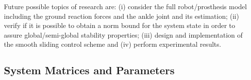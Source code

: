 \documentclass[letterpaper, 10 pt, conference]{ieeeconf}  %
\theoremstyle{plain}
\theoremstyle{definition}
\theoremstyle{remark}
\begin{document}
Future possible topics of research are: (i) consider the full robot/prosthesis model including the ground reaction forces and the ankle joint and its estimation; (ii) verify if it is possible to obtain a norm bound for the system state in order to assure global/semi-global stability properties; (iii) design and implementation of the smooth sliding control scheme and (iv) perform experimental results.

\begin{footnotesize}
\end{footnotesize}
 
%
%
%
%



\appendix


\subsection{System Matrices and Parameters}\label{ap:system}
\end{document}
